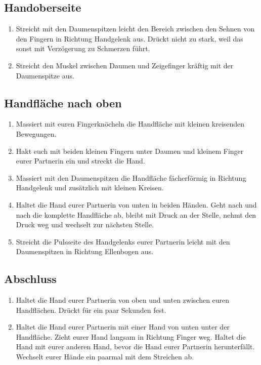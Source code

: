 \subsection{Handoberseite}
\begin{enumerate}
	\item {} Streicht mit den Daumenspitzen leicht den Bereich zwischen den Sehnen von den Fingern in Richtung Handgelenk aus. Drückt nicht zu stark, weil das sonst mit Verzögerung zu Schmerzen führt.
	\item {} Streicht den Muskel zwischen Daumen und Zeigefinger kräftig mit der Daumenspitze aus.
\end{enumerate}

\subsection{Handfläche nach oben}
\begin{enumerate}
	\item {} Massiert mit euren Fingerknöcheln die Handfläche mit kleinen kreisenden Bewegungen.
	\item {} Hakt euch mit beiden kleinen Fingern unter Daumen und kleinem Finger eurer Partnerin ein und streckt die Hand.
	\item {} Massiert mit den Daumenspitzen die Handfläche fächerförmig in Richtung Handgelenk und zusätzlich mit kleinen Kreisen.
	\item {} Haltet die Hand eurer Partnerin von unten in beiden Händen. Geht nach und nach die komplette Handfläche ab, bleibt mit Druck an der Stelle, nehmt den Druck weg und wechselt zur nächsten Stelle.
	\item {} Streicht die Pulsseite des Handgelenks eurer Partnerin leicht mit den Daumenspitzen in Richtung Ellenbogen aus.
\end{enumerate}

\subsection{Abschluss}
\begin{enumerate}
	\item {} Haltet die Hand eurer Partnerin von oben und unten zwischen euren Handflächen. Drückt für ein paar Sekunden fest.
	\item {} Haltet die Hand eurer Partnerin mit einer Hand von unten unter der Handfläche. Zieht eurer Hand langsam in Richtung Finger weg. Haltet die Hand mit eurer anderen Hand, bevor die Hand eurer Partnerin herunterfällt. Wechselt eurer Hände ein paarmal mit dem Streichen ab.
\end{enumerate}
